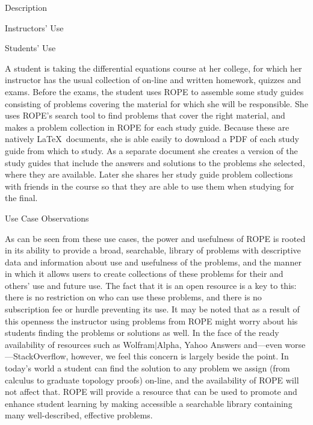 \documentclass[11pt]{article}
\begin{document}
\begin{section}{Description}
\begin{subsection}{Instructors' Use}
\end{subsection}

\begin{subsection}{Students' Use}

A student is taking the differential equations course at her college, for
which her instructor has the usual collection of on-line and written
homework, quizzes and exams.  Before the exams, the student uses ROPE to
assemble some study guides consisting of problems covering the material
for which she will be responsible.  She uses ROPE's search tool to find
problems that cover the right material, and makes a problem collection in
ROPE for each study guide.  Because these are natively \LaTeX\ documents,
she is able easily to download a PDF of each study guide from which to
study.  As a separate document she creates a version of the study guides
that include the answers and solutions to the problems she selected, where
they are available.  Later she shares her study guide problem collections
with friends in the course so that they are able to use them when studying
for the final.

\end{subsection}

\begin{subsection}{Use Case Observations}

As can be seen from these use cases, the power and usefulness of ROPE is
rooted in its ability to provide a broad, searchable, library of problems
with descriptive data and information about use and usefulness of the
problems, and the manner in which it allows users to create collections of
these problems for their and others' use and future use.  The fact that it
is an open resource is a key to this: there is no restriction on who can
use these problems, and there is no subscription fee or hurdle preventing
its use.  It may be noted that as a result of this openness the instructor
using problems from ROPE might worry about his students finding the
problems or solutions as well.  In the face of the ready availability of
resources such as Wolfram$|$Alpha, Yahoo Answers and---even
worse---StackOverflow, however, we feel this concern is largely beside the
point.  In today's world a student can find the solution to any problem we
assign (from calculus to graduate topology proofs) on-line, and the
availability of ROPE will not affect that.  ROPE will provide a resource
that can be used to promote and enhance student learning by making
accessible a searchable library containing many well-described, effective
problems.

\end{subsection}

\end{section}
\end{document}
